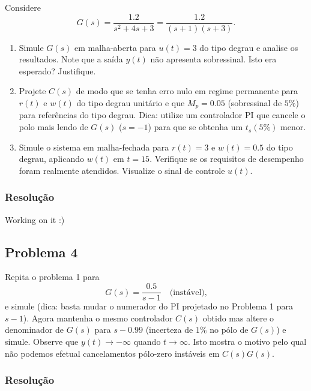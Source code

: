 \documentclass[
]{book}
\providecommand{\tightlist}{%
  \setlength{\itemsep}{0pt}\setlength{\parskip}{0pt}}
\begin{document}
Considere
\[
G(s) = \frac{1.2}{s^2+4s+3} = \frac{1.2}{(s+1)(s+3)}.
\]

\begin{enumerate}
\def\labelenumi{(\alph{enumi})}
\tightlist
\item
  Simule \(G(s)\) em malha-aberta para \(u(t) =3\) do tipo degrau e analise os resultados. Note que a saída \(y(t)\) não apresenta sobressinal. Isto era esperado? Justifique.
\item
  Projete \(C(s)\) de modo que se tenha erro nulo em regime permanente para \(r(t)\) e \(w(t)\) do tipo degrau unitário e que \(M_p=0.05\) (sobressinal de \(5\%\)) para referências do tipo degrau. Dica: utilize um controlador PI que cancele o polo mais lendo de \(G(s)\) (\(s=-1\)) para que se obtenha um \(t_s(5\%)\) menor.
\item
  Simule o sistema em malha-fechada para \(r(t) = 3\) e \(w(t) = 0.5\) do tipo degrau, aplicando \(w(t)\) em \(t=15\). Verifique se os requisitos de desempenho foram realmente atendidos. Visualize o sinal de controle \(u(t)\).
\end{enumerate}

\hypertarget{resoluuxe7uxe3o-14}{%
\subsubsection*{Resolução}\label{resoluuxe7uxe3o-14}}

Working on it :)

\hypertarget{problema-4-2}{%
\subsection*{Problema 4}\label{problema-4-2}}

Repita o problema 1 para
\[
G(s) = \frac{0.5}{s-1} \quad \text{(instável),}
\]
e simule (dica: basta mudar o numerador do PI projetado no Problema 1 para \(s-1\)). Agora mantenha o mesmo controlador \(C(s)\) obtido mas altere o denominador de \(G(s)\) para \(s-0.99\) (incerteza de \(1\%\) no pólo de \(G(s)\)) e simule. Observe que \(y(t) \to -\infty\) quando \(t\to\infty\). Isto mostra o motivo pelo qual não podemos efetual cancelamentos pólo-zero instáveis em \(C(s)G(s)\).

\hypertarget{resoluuxe7uxe3o-15}{%
\subsubsection*{Resolução}\label{resoluuxe7uxe3o-15}}
\end{document}
